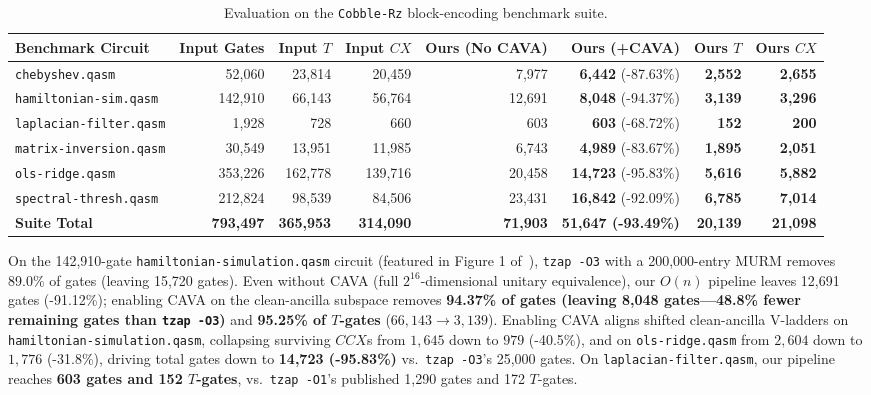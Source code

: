 \documentclass[11pt,a4paper]{article}
\theoremstyle{definition}
\begin{document}
\begin{table}[ht]
\centering
\caption{Evaluation on the \texttt{Cobble-Rz} block-encoding benchmark suite.}
\label{tab:cobble}
\begin{tabular}{lrrrrrrr}
\toprule
Benchmark Circuit & Input Gates & Input $T$ & Input $\mathit{CX}$ & Ours (No \textsc{CAVA}) & \textbf{Ours (\textsc{+CAVA})} & \textbf{Ours $T$} & \textbf{Ours $\mathit{CX}$} \\
\midrule
\texttt{chebyshev.qasm} & 52,060 & 23,814 & 20,459 & 7,977 & \textbf{6,442} (-87.63\%) & \textbf{2,552} & \textbf{2,655} \\
\texttt{hamiltonian-sim.qasm} & 142,910 & 66,143 & 56,764 & 12,691 & \textbf{8,048} (-94.37\%) & \textbf{3,139} & \textbf{3,296} \\
\texttt{laplacian-filter.qasm} & 1,928 & 728 & 660 & 603 & \textbf{603} (-68.72\%) & \textbf{152} & \textbf{200} \\
\texttt{matrix-inversion.qasm} & 30,549 & 13,951 & 11,985 & 6,743 & \textbf{4,989} (-83.67\%) & \textbf{1,895} & \textbf{2,051} \\
\texttt{ols-ridge.qasm} & 353,226 & 162,778 & 139,716 & 20,458 & \textbf{14,723} (-95.83\%) & \textbf{5,616} & \textbf{5,882} \\
\texttt{spectral-thresh.qasm} & 212,824 & 98,539 & 84,506 & 23,431 & \textbf{16,842} (-92.09\%) & \textbf{6,785} & \textbf{7,014} \\
\midrule
\textbf{Suite Total} & \textbf{793,497} & \textbf{365,953} & \textbf{314,090} & \textbf{71,903} & \textbf{51,647 (-93.49\%)} & \textbf{20,139} & \textbf{21,098} \\
\bottomrule
\end{tabular}
\end{table}

On the 142,910-gate \texttt{hamiltonian-simulation.qasm} circuit (featured in Figure 1 of~\cite{albarghouthi2026murm}), \texttt{tzap -O3} with a 200,000-entry MURM removes 89.0\% of gates (leaving 15,720 gates). Even without \textsc{CAVA} (full $2^{16}$-dimensional unitary equivalence), our $O(n)$ pipeline leaves 12,691 gates (-91.12\%); enabling \textsc{CAVA} on the clean-ancilla subspace removes \textbf{94.37\% of gates (leaving 8,048 gates---48.8\% fewer remaining gates than \texttt{tzap -O3})} and \textbf{95.25\% of $T$-gates} ($66{,}143 \to 3{,}139$). Enabling \textsc{CAVA} aligns shifted clean-ancilla V-ladders on \texttt{hamiltonian-simulation.qasm}, collapsing surviving $\mathit{CCX}$s from $1{,}645$ down to $979$ (-40.5\%), and on \texttt{ols-ridge.qasm} from $2{,}604$ down to $1{,}776$ (-31.8\%), driving total gates down to \textbf{14,723 (-95.83\%)} vs.\ \texttt{tzap -O3}'s 25,000 gates. On \texttt{laplacian-filter.qasm}, our pipeline reaches \textbf{603 gates and 152 $T$-gates}, vs.\ \texttt{tzap -O1}'s published 1,290 gates and 172 $T$-gates.
\end{document}
